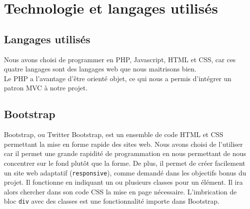 \documentclass[12pt,titlepage]{article}
\begin{document}
\section{Technologie et langages utilisés}

\subsection{Langages utilisés}

Nous avons choisi de programmer en PHP, Javascript, HTML et CSS, car ces quatre langages sont des langages web que nous maitrisons bien.\\
Le PHP a l'avantage d'être orienté objet, ce qui nous a permis d'intégrer un patron MVC à notre projet.

\subsection{Bootstrap}

Bootstrap, ou Twitter Bootstrap, est un ensemble de code HTML et CSS permettant la mise en forme rapide des sites web.
\medbreak
Nous avons choisi de l'utiliser car il permet une grande rapidité de programmation en nous permettant de nous concentrer sur le fond plutôt que la forme. De plus, il permet de créer facilement un site web adaptatif (\texttt{responsive}), comme demandé dans les objectifs bonus du projet.
\medbreak
Il fonctionne en indiquant un ou plusieurs classes pour un élément. Il ira alors chercher dans son code CSS la mise en page nécessaire. L'imbrication de bloc \texttt{div} avec des classes est une fonctionnalité importe dans Bootstrap.
\end{document}
